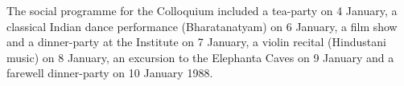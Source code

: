 \medskip

The social programme for the Colloquium included a tea-party on 4 January, a classical Indian dance performance (Bharatanatyam) on 6 January, a film show and a dinner-party at the Institute on 7 January, a violin recital (Hindustani music) on 8 January, an excursion to the Elephanta Caves on 9 January and a farewell dinner-party on 10 January 1988.



\lhead[]{}

\vfill\eject
